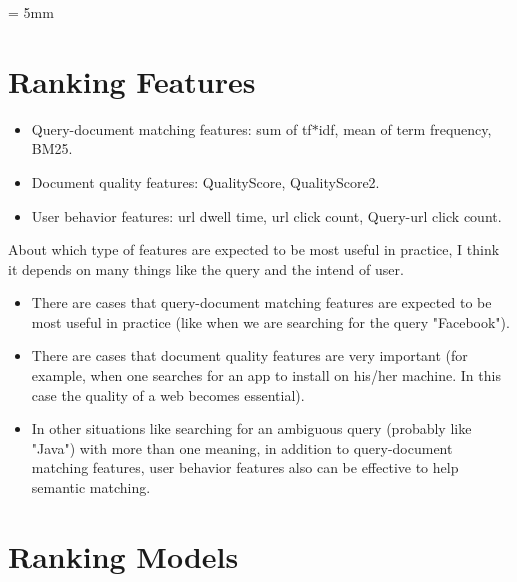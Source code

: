 \documentclass[11pt]{article}
\begin{document}



\baselineskip = 5mm

%

\section*{Ranking Features}%

\begin{itemize}
\item Query-document matching features: sum of tf$*$idf, mean of term frequency, BM25.
\item Document quality features: QualityScore, QualityScore2.
\item User behavior features: url dwell time, url click count, Query-url click count.
\end{itemize}
About which type of features are expected to be most useful in practice, I think it depends on many things like the query and the intend of user. 
\begin{itemize}
\item There are cases that query-document matching features are expected to be most useful in practice (like when we are searching for the query "Facebook"). 
\item There are cases that document quality features are very important (for example, when one searches for an app to install on his/her machine. In this case the quality of a web becomes essential).
\item In other situations like searching for an ambiguous query (probably like "Java") with more than one meaning, in addition to query-document matching features, user behavior features also can be effective to help semantic matching. 
\end{itemize}




\section*{Ranking Models}%
\end{document}
